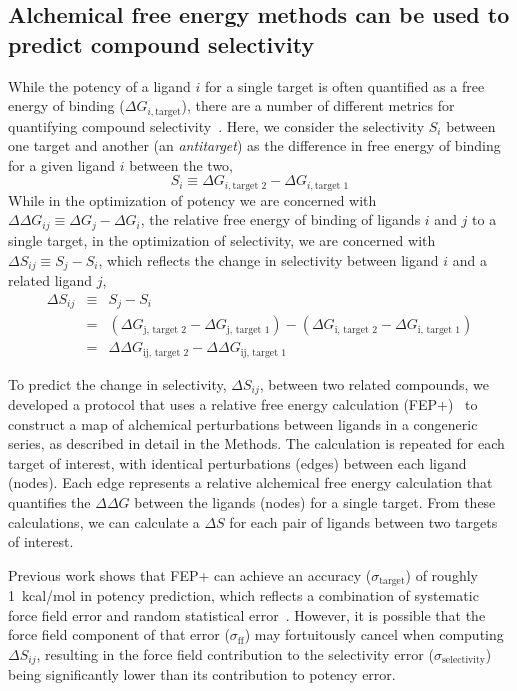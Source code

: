 \documentclass[phd,tocprelim]{cornell}
\begin{document}
\subsection{Alchemical free energy methods can be used to predict compound selectivity}
While the potency of a ligand $i$ for a single target is often quantified as a free energy of binding ($\Delta G_{i, \text{target}}$), there are a number of different metrics for quantifying compound selectivity~\citep{Bosc:2017gs,Cheng2010-ip}. 
Here, we consider the selectivity $S_i$ between one target and another (an \emph{antitarget}) as the difference in free energy of binding for a given ligand $i$ between the two,
\begin{equation}\label{eq:selectivity}
S_{i} \equiv \Delta G_{i, \text{target 2}} - \Delta G_{i, \text{target 1}}
\end{equation}
While in the optimization of potency we are concerned with $\Delta\Delta G_{ij} \equiv \Delta G_j - \Delta G_i$, the relative free energy of binding of ligands $i$ and $j$ to a single target, in the optimization of selectivity, we are concerned with $\Delta S_{ij} \equiv S_j - S_i$, which reflects the change in selectivity between ligand $i$ and a related ligand $j$,
\begin{eqnarray}\label{eq:delta-selectivity}
\Delta S_{ij} &\equiv& S_j - S_i \\
&=& (\Delta G_{\text{j, target 2}} - \Delta G_{\text{j, target 1}}) - (\Delta G_{\text{i, target 2}} - \Delta G_{\text{i, target 1}}) \nonumber \\
&=& \Delta\Delta G_{\text{ij, target 2}} - \Delta\Delta G_{\text{ij, target 1}} \nonumber
\end{eqnarray}


To predict the change in selectivity, $\Delta S_{ij}$, between two related compounds, we developed a protocol that uses a relative free energy calculation (FEP+)~\citep{Wang:J.Am.Chem.Soc.:2015} to construct a map of alchemical perturbations between ligands in a congeneric series, as described in detail in the Methods. 
The calculation is repeated for each target of interest, with identical perturbations (edges) between each ligand (nodes). 
Each edge represents a relative alchemical free energy calculation that quantifies the $\Delta \Delta G$ between the ligands (nodes) for a single target.  From these calculations, we can calculate a $\Delta S$ for each pair of ligands between two targets of interest. 

Previous work shows that FEP+ can achieve an accuracy ($\sigma_\text{target}$) of roughly 1~kcal/mol in potency prediction, which reflects a combination of systematic force field error and random statistical error~\citep{Wang:J.Am.Chem.Soc.:2015}. 
However, it is possible that the force field component of that error ($\sigma_\text{ff}$) may fortuitously cancel when computing $\Delta S_{ij}$, resulting in the force field contribution to the selectivity error ($\sigma_\text{selectivity}$) being significantly lower than its contribution to potency error. 
\end{document}
